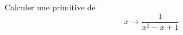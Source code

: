 Calculer une primitive de 
\begin{displaymath}
 x \rightarrow \frac{1}{x^2-x+1}
\end{displaymath}
\bigskip \bigskip